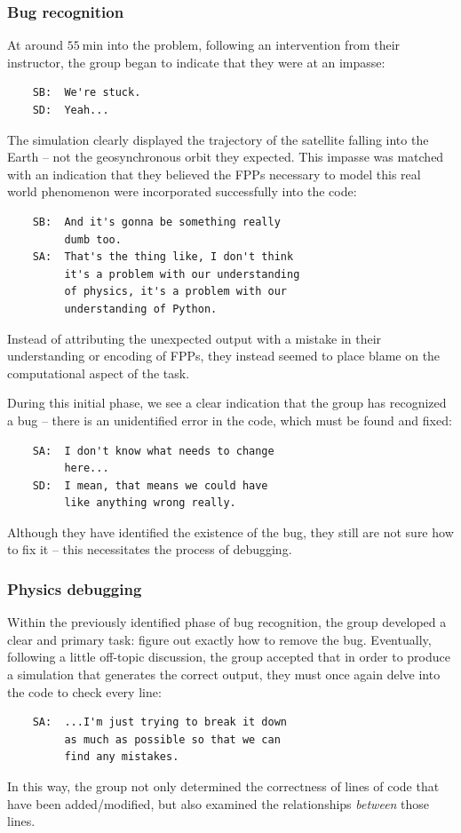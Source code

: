 \documentclass{msuphddissertation}
\begin{document}
\begin{doublespace}
\subsubsection{Bug recognition}

At around $\SI{55}{\minute}$ into the problem, following an intervention from their instructor, the group began to indicate that they were at an impasse:  \begin{verbatim}
    SB:  We're stuck.
    SD:  Yeah...
\end{verbatim}  The simulation clearly displayed the trajectory of the satellite falling into the Earth -- not the geosynchronous orbit they expected.  This impasse was matched with an indication that they believed the FPPs necessary to model this real world phenomenon were incorporated successfully into the code:  \begin{verbatim}
    SB:  And it's gonna be something really 
         dumb too.
    SA:  That's the thing like, I don't think 
         it's a problem with our understanding 
         of physics, it's a problem with our 
         understanding of Python.
\end{verbatim}  Instead of attributing the unexpected output with a mistake in their understanding or encoding of FPPs, they instead seemed to place blame on the computational aspect of the task.

During this initial phase, we see a clear indication that the group has recognized a bug -- there is an unidentified error in the code, which must be found and fixed:  \begin{verbatim}
    SA:  I don't know what needs to change 
         here...
    SD:  I mean, that means we could have 
         like anything wrong really.
\end{verbatim}  Although they have identified the existence of the bug, they still are not sure how to fix it -- this necessitates the process of debugging.

\subsubsection{Physics debugging}

Within the previously identified phase of bug recognition, the group developed a clear and primary task: figure out exactly how to remove the bug.  Eventually, following a little off-topic discussion, the group accepted that in order to produce a simulation that generates the correct output, they must once again delve into the code to check every line:  \begin{verbatim}
    SA:  ...I'm just trying to break it down 
         as much as possible so that we can 
         find any mistakes.
\end{verbatim}  In this way, the group not only determined the correctness of lines of code that have been added/modified, but also examined the relationships \emph{between} those lines.


\end{doublespace}
\end{document}
